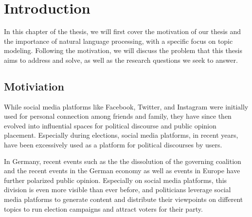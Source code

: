 

%
%

\chapter{Introduction}\label{ch:1-intro}%
%

In this chapter of the thesis, we will first cover the motivation of our thesis and the importance of natural language processing, with a specific focus on topic modeling.
Following the motivation, we will discuss the problem that this thesis aims to address and solve, as well as the research questions we seek to answer.

\section{Motiviation}
While social media platforms like Facebook, Twitter, and Instagram were initially used for personal connection among friends and family, they have since then evolved into influential spaces for political discourse and public opinion placement.
Especially during elections, social media platforms, in recent years, have been excessively used as a platform for political discourses by users.

In Germany, recent events such as the the dissolution of the governing coalition and the recent events in the German economy as well as events in Europe have further polarized public opinion.
Especially on social media platforms, this division is even more visible than ever before, and politicians leverage social media platforms to generate content and distribute their viewpoints on different topics to run election campaigns and attract voters for their party.


